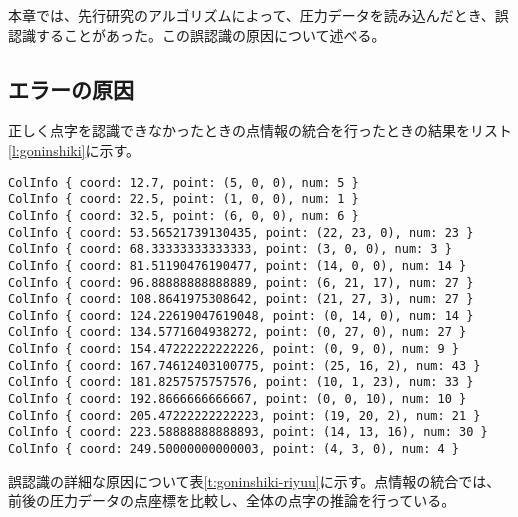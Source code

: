 本章では、先行研究のアルゴリズムによって、圧力データを読み込んだとき、誤認識することがあった。この誤認識の原因について述べる。

\subsection{エラーの原因}
正しく点字を認識できなかったときの点情報の統合を行ったときの結果をリスト\ref{l:goninshiki}に示す。
\begin{lstlisting}[caption=点情報の統合を行った結果, label=l:goninshiki]
ColInfo { coord: 12.7, point: (5, 0, 0), num: 5 }
ColInfo { coord: 22.5, point: (1, 0, 0), num: 1 }
ColInfo { coord: 32.5, point: (6, 0, 0), num: 6 }
ColInfo { coord: 53.56521739130435, point: (22, 23, 0), num: 23 }
ColInfo { coord: 68.33333333333333, point: (3, 0, 0), num: 3 }
ColInfo { coord: 81.51190476190477, point: (14, 0, 0), num: 14 }
ColInfo { coord: 96.88888888888889, point: (6, 21, 17), num: 27 }
ColInfo { coord: 108.8641975308642, point: (21, 27, 3), num: 27 }
ColInfo { coord: 124.22619047619048, point: (0, 14, 0), num: 14 }
ColInfo { coord: 134.5771604938272, point: (0, 27, 0), num: 27 }
ColInfo { coord: 154.47222222222226, point: (0, 9, 0), num: 9 }
ColInfo { coord: 167.74612403100775, point: (25, 16, 2), num: 43 }
ColInfo { coord: 181.8257575757576, point: (10, 1, 23), num: 33 }
ColInfo { coord: 192.8666666666667, point: (0, 0, 10), num: 10 }
ColInfo { coord: 205.47222222222223, point: (19, 20, 2), num: 21 }
ColInfo { coord: 223.58888888888893, point: (14, 13, 16), num: 30 }
ColInfo { coord: 249.50000000000003, point: (4, 3, 0), num: 4 }
\end{lstlisting}
誤認識の詳細な原因について表\ref{t:goninshiki-riyuu}に示す。点情報の統合では、前後の圧力データの点座標を比較し、全体の点字の推論を行っている。
